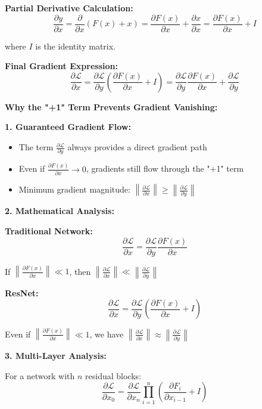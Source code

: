 \documentclass[12pt]{article}
\begin{document}
\begin{enumerate}[(a)]
{    \textbf{Partial Derivative Calculation:}
    $$\frac{\partial y}{\partial x} = \frac{\partial}{\partial x}(F(x) + x) = \frac{\partial F(x)}{\partial x} + \frac{\partial x}{\partial x} = \frac{\partial F(x)}{\partial x} + I$$
    
    where $I$ is the identity matrix.
    
    \textbf{Final Gradient Expression:}
    $$\frac{\partial \mathcal{L}}{\partial x} = \frac{\partial \mathcal{L}}{\partial y}\left(\frac{\partial F(x)}{\partial x} + I\right) = \frac{\partial \mathcal{L}}{\partial y} \frac{\partial F(x)}{\partial x} + \frac{\partial \mathcal{L}}{\partial y}$$
    
    \textbf{Why the "+1" Term Prevents Gradient Vanishing:}
    
    \textbf{1. Guaranteed Gradient Flow:}
    \begin{itemize}
        \item The term $\frac{\partial \mathcal{L}}{\partial y}$ always provides a direct gradient path
        \item Even if $\frac{\partial F(x)}{\partial x} \rightarrow 0$, gradients still flow through the "+1" term
        \item Minimum gradient magnitude: $\left\|\frac{\partial \mathcal{L}}{\partial x}\right\| \geq \left\|\frac{\partial \mathcal{L}}{\partial y}\right\|$
    \end{itemize}
    
    \textbf{2. Mathematical Analysis:}
    
    \textbf{Traditional Network:}
    $$\frac{\partial \mathcal{L}}{\partial x} = \frac{\partial \mathcal{L}}{\partial y} \frac{\partial F(x)}{\partial x}$$
    
    If $\left\|\frac{\partial F(x)}{\partial x}\right\| \ll 1$, then $\left\|\frac{\partial \mathcal{L}}{\partial x}\right\| \ll \left\|\frac{\partial \mathcal{L}}{\partial y}\right\|$
    
    \textbf{ResNet:}
    $$\frac{\partial \mathcal{L}}{\partial x} = \frac{\partial \mathcal{L}}{\partial y}\left(\frac{\partial F(x)}{\partial x} + I\right)$$
    
    Even if $\left\|\frac{\partial F(x)}{\partial x}\right\| \ll 1$, we have $\left\|\frac{\partial \mathcal{L}}{\partial x}\right\| \approx \left\|\frac{\partial \mathcal{L}}{\partial y}\right\|$
    
    \textbf{3. Multi-Layer Analysis:}
    
    For a network with $n$ residual blocks:
    $$\frac{\partial \mathcal{L}}{\partial x_0} = \frac{\partial \mathcal{L}}{\partial x_n} \prod_{i=1}^n \left(\frac{\partial F_i}{\partial x_{i-1}} + I\right)$$
    
}
\end{enumerate}
\end{document}
